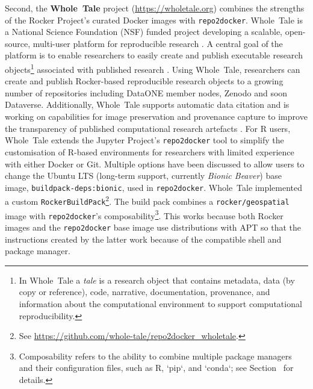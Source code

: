 Second, the \textbf{Whole~Tale} project (\url{https://wholetale.org})
combines the strengths of the Rocker Project's curated Docker images
with \texttt{repo2docker}. Whole~Tale is a National Science Foundation
(NSF) funded project developing a scalable, open-source, multi-user
platform for reproducible research \citep{brinckman2019, chard2019a}. A
central goal of the platform is to enable researchers to easily create
and publish executable research
objects\footnote{In Whole~Tale a \emph{tale} is a research object that contains metadata, data (by copy or reference), code, narrative, documentation, provenance, and information about the computational environment to support computational reproducibility.}
associated with published research \citep{chard2019b}. Using Whole~Tale,
researchers can create and publish Rocker-based reproducible research
objects to a growing number of repositories including DataONE member
nodes, Zenodo and soon Dataverse. Additionally, Whole~Tale supports
automatic data citation and is working on capabilities for image
preservation and provenance capture to improve the transparency of
published computational research artefacts
\citep{mecum2018, mcphillips2019}. For R users, Whole~Tale extends the
Jupyter Project's \texttt{repo2docker} tool to simplify the
customisation of R-based environments for researchers with limited
experience with either Docker or Git. Multiple options have been
discussed to allow users to change the Ubuntu LTS (long-term support,
currently \emph{Bionic Beaver}) base image,
\texttt{buildpack-deps:bionic}, used in \texttt{repo2docker}. Whole~Tale
implemented a custom
\texttt{RockerBuildPack}\footnote{See \href{https://github.com/whole-tale/repo2docker\_wholetale}{https://github.com/whole-tale/repo2docker\_wholetale}.}.
The build pack combines a \texttt{rocker/geospatial} image with
\texttt{repo2docker}'s
composability\footnote{Composability refers to the ability to combine multiple package managers and their configuration files, such as R, `pip`, and `conda`; see Section~ for details.}.
This works because both Rocker images and the \texttt{repo2docker} base
image use distributions with APT \citep{wikipedia_contributors_apt_2020}
so that the instructions created by the latter work because of the
compatible shell and package manager.

